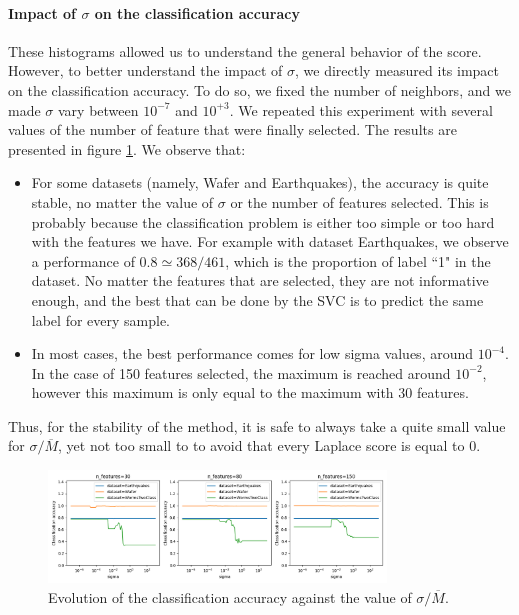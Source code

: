 \documentclass[11pt]{article}
\begin{document}
\paragraph{Impact of $\sigma$ on the classification accuracy} These histograms allowed us to understand the general behavior of the score. However, to better understand the impact of $\sigma$, we directly measured its impact on the classification accuracy. To do so, we fixed the number of neighbors, and we made $\sigma$ vary between $10^{-7}$ and $10^{+3}$. We repeated this experiment with several values of the number of feature that were finally selected. The results are presented in figure \ref{fig:accuracy_vs_sigma}. We observe that:

\begin{itemize}
    \item For some datasets (namely, Wafer and Earthquakes), the accuracy is quite stable, no matter the value of $\sigma$ or the number of features selected. This is probably because the classification problem is either too simple or too hard with the features we have. For example with dataset Earthquakes, we observe a performance of $0.8 \simeq 368/461$, which is the proportion of label ``1" in the dataset. No matter the features that are selected, they are not informative enough, and the best that can be done by the SVC is to predict the same label for every sample. 
    \item In most cases, the best performance comes for low sigma values, around $10^{-4}$. In the case of 150 features selected, the maximum is reached around $10^{-2}$, however this maximum is only equal to the maximum with 30 features. 
\end{itemize}

Thus, for the stability of the method, it is safe to always take a quite small value for $\sigma/\overline{M}$, yet not too small to to avoid that every Laplace score is equal to $0$.

\begin{figure}
    \centering
    \includegraphics[width=0.80\textwidth]{figures/accuracy_vs_sigma.png}
    \caption{Evolution of the classification accuracy against the value of $\sigma / \overline{M}$.}
    \label{fig:accuracy_vs_sigma}
\end{figure}
\end{document}
